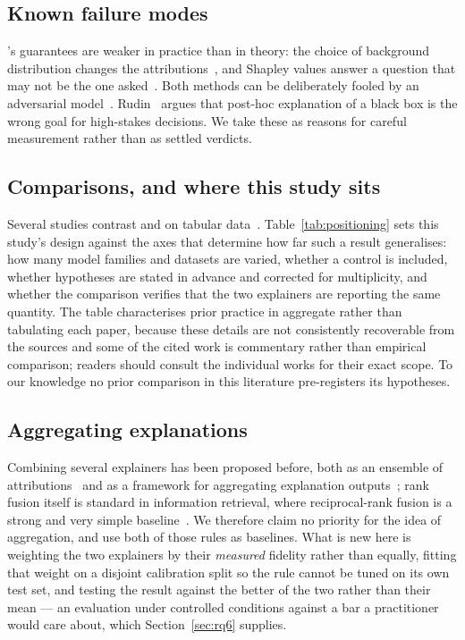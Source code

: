 \subsection{Known failure modes}
\shap{}'s guarantees are weaker in practice than in theory: the choice of background
distribution changes the attributions~\cite{sundararajan2020many}, and Shapley values
answer a question that may not be the one asked~\cite{kumar2020problems}. Both methods
can be deliberately fooled by an adversarial
model~\cite{slack2020fooling}. Rudin~\cite{rudin2019stop} argues that post-hoc
explanation of a black box is the wrong goal for high-stakes decisions. We take these
as reasons for careful measurement rather than as settled verdicts.

\subsection{Comparisons, and where this study sits}
Several studies contrast \shap{} and \lime{} on tabular
data~\cite{man2021best,salih2024perspective,elshawi2019interpretability,duell2021comparison,amparore2021trust}.
Table~\ref{tab:positioning} sets this study's design against the axes that determine
how far such a result generalises: how many model families and datasets are varied,
whether a control is included, whether hypotheses are stated in advance and corrected
for multiplicity, and whether the comparison verifies that the two explainers are
reporting the same quantity. The table characterises prior practice in aggregate
rather than tabulating each paper, because these details are not consistently
recoverable from the sources and some of the cited work is commentary rather than
empirical comparison; readers should consult the individual works for their exact
scope. To our knowledge no prior comparison in this literature pre-registers its
hypotheses.



\subsection{Aggregating explanations}
Combining several explainers has been proposed before, both as an ensemble of
attributions~\cite{rieger2020simple} and as a framework for aggregating explanation
outputs~\cite{bhatt2020aggregating}; rank fusion itself is standard in information
retrieval, where reciprocal-rank fusion is a strong and very simple
baseline~\cite{cormack2009reciprocal}. We therefore claim no priority for the idea of
aggregation, and use both of those rules as baselines. What is new here is weighting the
two explainers by their \emph{measured} fidelity rather than equally, fitting that
weight on a disjoint calibration split so the rule cannot be tuned on its own test set,
and testing the result against the better of the two rather than their mean --- an
evaluation under controlled conditions against a bar a practitioner would care about,
which Section~\ref{sec:rq6} supplies.

